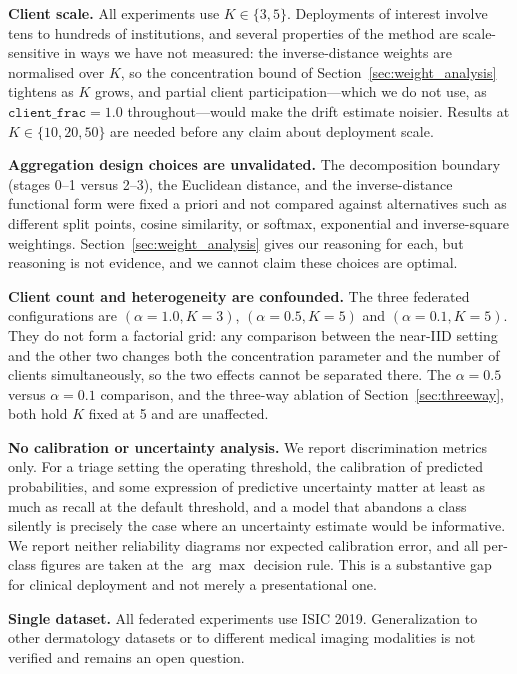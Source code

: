 \documentclass{ieeeaccess}
\begin{document}
\textbf{Client scale.} All experiments use $K \in \{3,5\}$. Deployments of interest involve tens to hundreds of institutions, and several properties of the method are scale-sensitive in ways we have not measured: the inverse-distance weights are normalised over $K$, so the concentration bound of Section~\ref{sec:weight_analysis} tightens as $K$ grows, and partial client participation---which we do not use, as $\texttt{client\_frac}{=}1.0$ throughout---would make the drift estimate noisier. Results at $K \in \{10,20,50\}$ are needed before any claim about deployment scale.

\textbf{Aggregation design choices are unvalidated.} The decomposition boundary (stages 0--1 versus 2--3), the Euclidean distance, and the inverse-distance functional form were fixed a priori and not compared against alternatives such as different split points, cosine similarity, or softmax, exponential and inverse-square weightings. Section~\ref{sec:weight_analysis} gives our reasoning for each, but reasoning is not evidence, and we cannot claim these choices are optimal.

\textbf{Client count and heterogeneity are confounded.} The three federated configurations are $(\alpha{=}1.0, K{=}3)$, $(\alpha{=}0.5, K{=}5)$ and $(\alpha{=}0.1, K{=}5)$. They do not form a factorial grid: any comparison between the near-IID setting and the other two changes both the concentration parameter and the number of clients simultaneously, so the two effects cannot be separated there. The $\alpha{=}0.5$ versus $\alpha{=}0.1$ comparison, and the three-way ablation of Section~\ref{sec:threeway}, both hold $K$ fixed at 5 and are unaffected.

\textbf{No calibration or uncertainty analysis.} We report discrimination metrics only. For a triage setting the operating threshold, the calibration of predicted probabilities, and some expression of predictive uncertainty matter at least as much as recall at the default threshold, and a model that abandons a class silently is precisely the case where an uncertainty estimate would be informative. We report neither reliability diagrams nor expected calibration error, and all per-class figures are taken at the $\arg\max$ decision rule. This is a substantive gap for clinical deployment and not merely a presentational one.

\textbf{Single dataset.} All federated experiments use ISIC 2019. Generalization to other dermatology datasets or to different medical imaging modalities is not verified and remains an open question.
\end{document}
